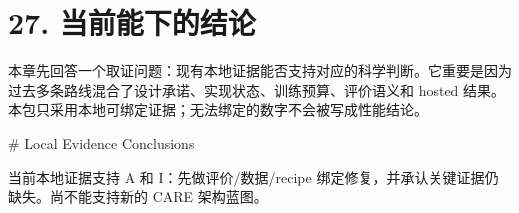 \section{27. 当前能下的结论}

本章先回答一个取证问题：现有本地证据能否支持对应的科学判断。它重要是因为过去多条路线混合了设计承诺、实现状态、训练预算、评价语义和 hosted 结果。本包只采用本地可绑定证据；无法绑定的数字不会被写成性能结论。



# Local Evidence Conclusions

当前本地证据支持 A 和 I：先做评价/数据/recipe 绑定修复，并承认关键证据仍缺失。尚不能支持新的 CARE 架构蓝图。




\clearpage